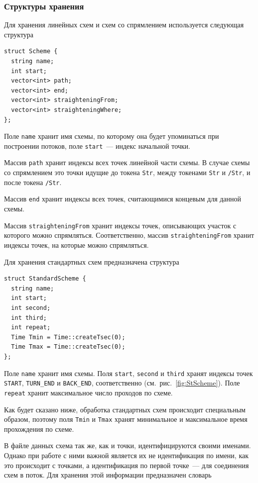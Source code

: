 \documentclass[12pt]{article}
\theoremstyle{plain}
\begin{document}
\subsubsection{Структуры хранения}
\label{sec:SchemeStructures}

Для хранения линейных схем и схем со спрямлением используется следующая структура
\begin{verbatim}
struct Scheme {
  string name;
  int start;
  vector<int> path;
  vector<int> end;
  vector<int> straighteningFrom;
  vector<int> straighteningWhere;
}; 
\end{verbatim}

Поле \texttt{name} хранит имя схемы, по которому она будет упоминаться при построении потоков, поле \texttt{start}~--- индекс начальной точки. 

Массив \texttt{path} хранит индексы всех точек линейной части схемы. В случае схемы со спрямлением это точки идущие до токена \texttt{Str}, между токенами \texttt{Str} и \texttt{/Str}, и после токена \texttt{/Str}.

Массив \texttt{end} хранит индексы всех точек, считающимися концевым для данной схемы.

Массив \texttt{straighteningFrom} хранит индексы точек, описывающих участок с которого можно спрямляться. Соответственно, массив \texttt{straighteningFrom} хранит индексы точек, на которые можно спрямляться.

\medskip

Для хранения стандартных схем предназначена структура
\begin{verbatim}
struct StandardScheme {
  string name;
  int start;
  int seсond; 
  int third; 
  int repeat;
  Time Tmin = Time::createTsec(0);
  Time Tmax = Time::createTsec(0);
};
\end{verbatim}

Поле \texttt{name} хранит имя схемы. Поля \texttt{start}, \texttt{second} и \texttt{third} хранят индексы точек \texttt{START}, \texttt{TURN\_END} и \texttt{BACK\_END}, соответственно (см.~рис.~\ref{fig:StScheme}). Поле \texttt{repeat} хранит максимальное число проходов по схеме. 

Как будет сказано ниже, обработка стандартных схем происходит специальным образом, поэтому поля \texttt{Tmin} и \texttt{Tmax} хранят минимальное и максимальное время прохождения по схеме.

\medskip

В файле данных схема так же, как и точки, идентифицируются своими именами. Однако при работе с ними важной является их не идентификация по имени, как это происходит с точками, а идентификация по первой точке~--- для соединения схем в поток. Для хранения этой информации предназначен словарь
\end{document}
